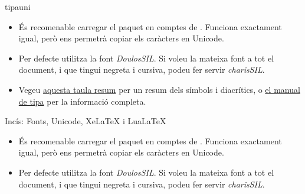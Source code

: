 \begin{frame}[fragile]{tipauni}
\begin{itemize}
    \item És recomenable carregar el paquet  en comptes de . Funciona exactament igual, però ens permetrà copiar els caràcters en Unicode.
    \item Per defecte utilitza la font \emph{DoulosSIL}. Si voleu la mateixa font a tot el document, i que tingui negreta i cursiva, podeu fer servir \emph{charisSIL}.
    \item Vegeu \href{https://jon.dehdari.org/tutorials/tipachart_mod.pdf}{aquesta taula resum} per un resum dels símbols i diacrítics, o \href{https://ctan.org/pkg/tipa}{el manual de tipa} per la informació completa.
\end{itemize}
\end{frame}

\begin{frame}[fragile]{Incís: Fonts, Unicode, Xe\LaTeX{} i Lua\LaTeX{}}
\begin{itemize}
    \item És recomenable carregar el paquet  en comptes de . Funciona exactament igual, però ens permetrà copiar els caràcters en Unicode.
    \item Per defecte utilitza la font \emph{DoulosSIL}. Si voleu la mateixa font a tot el document, i que tingui negreta i cursiva, podeu fer servir \emph{charisSIL}.
\end{itemize}
\end{frame}

